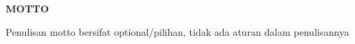 \cleardoublepage
\centerline{\large\bfseries MOTTO}
{}
\vspace*{40pt}

Penulisan motto bersifat optional/pilihan, tidak ada aturan dalam penulisannya
